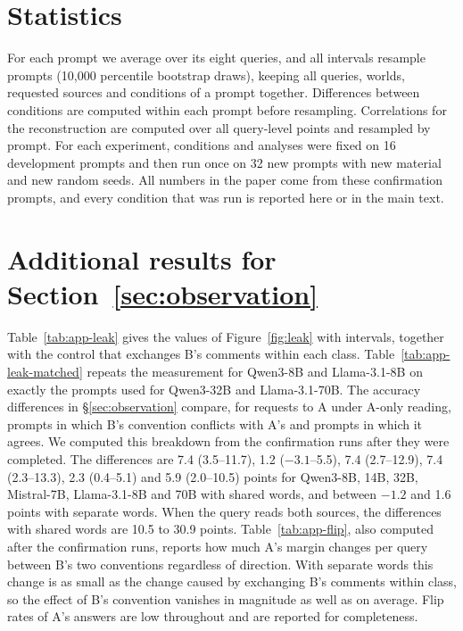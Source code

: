 \section{Statistics}
\label{app:stats}

For each prompt we average over its eight queries, and all intervals resample prompts (10{,}000 percentile bootstrap draws), keeping all queries, worlds, requested sources and conditions of a prompt together.
Differences between conditions are computed within each prompt before resampling.
Correlations for the reconstruction are computed over all query-level points and resampled by prompt.
For each experiment, conditions and analyses were fixed on 16 development prompts and then run once on 32 new prompts with new material and new random seeds.
All numbers in the paper come from these confirmation prompts, and every condition that was run is reported here or in the main text.

\section{Additional results for Section~\ref{sec:observation}}
\label{app:observation}

Table~\ref{tab:app-leak} gives the values of Figure~\ref{fig:leak} with intervals, together with the control that exchanges B's comments within each class.
Table~\ref{tab:app-leak-matched} repeats the measurement for Qwen3-8B and Llama-3.1-8B on exactly the prompts used for Qwen3-32B and Llama-3.1-70B.
The accuracy differences in \S\ref{sec:observation} compare, for requests to A under A-only reading, prompts in which B's convention conflicts with A's and prompts in which it agrees. We computed this breakdown from the confirmation runs after they were completed.
The differences are 7.4 (3.5--11.7), 1.2 ($-3.1$--5.5), 7.4 (2.7--12.9), 7.4 (2.3--13.3), 2.3 (0.4--5.1) and 5.9 (2.0--10.5) points for Qwen3-8B, 14B, 32B, Mistral-7B, Llama-3.1-8B and 70B with shared words, and between $-1.2$ and 1.6 points with separate words.
When the query reads both sources, the differences with shared words are 10.5 to 30.9 points.
Table~\ref{tab:app-flip}, also computed after the confirmation runs, reports how much A's margin changes per query between B's two conventions regardless of direction.
With separate words this change is as small as the change caused by exchanging B's comments within class, so the effect of B's convention vanishes in magnitude as well as on average.
Flip rates of A's answers are low throughout and are reported for completeness.

